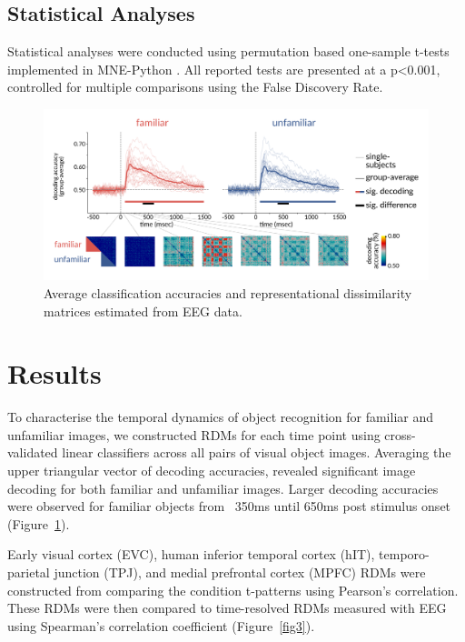 \documentclass[10pt,letterpaper]{article}
\begin{document}
\subsection{Statistical Analyses}

Statistical analyses were conducted using permutation based one-sample t-tests
implemented in MNE-Python \cite{Gramfort2013-tl}. All reported tests are
presented at a p\textless0.001, controlled for multiple comparisons using the False
Discovery Rate.

\begin{figure}[ht]
  \begin{center}
  \includegraphics[width=\linewidth]{figures/figure2.png}
  \end{center}
  \caption{
    Average classification accuracies and representational dissimilarity
    matrices estimated from EEG data.
  } 
  \label{fig2}
  \end{figure}

\section{Results}

To characterise the temporal dynamics of object recognition for familiar and
unfamiliar images, we constructed RDMs for each time point using cross-validated
linear classifiers across all pairs of visual object images. Averaging the upper
triangular vector of decoding accuracies, revealed significant image decoding
for both familiar and unfamiliar images. Larger decoding accuracies were
observed for familiar objects from ~350ms until 650ms post stimulus onset
(Figure~\ref{fig2}). 

Early visual cortex (EVC), human inferior temporal cortex (hIT),
temporo-parietal junction (TPJ), and medial prefrontal cortex (MPFC) RDMs were
constructed from comparing the condition t-patterns using Pearson’s correlation.
These RDMs were then compared to time-resolved RDMs measured with EEG using
Spearman’s correlation coefficient (Figure~\ref{fig3}). 
\end{document}

